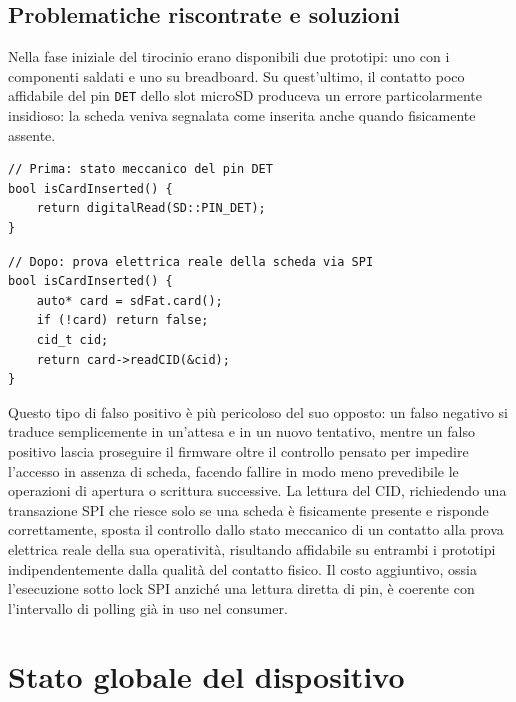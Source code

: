 \subsection{Problematiche riscontrate e soluzioni}

Nella fase iniziale del tirocinio erano disponibili due prototipi: uno con i
componenti saldati e uno su breadboard. Su quest'ultimo, il contatto poco
affidabile del pin \texttt{DET} dello slot microSD produceva un errore
particolarmente insidioso: la scheda veniva segnalata come inserita anche
quando fisicamente assente.

\begin{listing}[H]
\begin{verbatim}
// Prima: stato meccanico del pin DET
bool isCardInserted() {
    return digitalRead(SD::PIN_DET);
}
\end{verbatim}
\caption{Rilevamento della scheda basato sul pin DET}
\label{listing:det-before}
\end{listing}

\begin{listing}[H]
\begin{verbatim}
// Dopo: prova elettrica reale della scheda via SPI
bool isCardInserted() {
    auto* card = sdFat.card();
    if (!card) return false;
    cid_t cid;
    return card->readCID(&cid);
}
\end{verbatim}
\caption{Rilevamento della scheda tramite lettura del CID}
\label{listing:det-after}
\end{listing}

Questo tipo di falso positivo è più pericoloso del suo opposto: un falso
negativo si traduce semplicemente in un'attesa e in un nuovo tentativo, mentre
un falso positivo lascia proseguire il firmware oltre il controllo pensato
per impedire l'accesso in assenza di scheda, facendo fallire in modo meno
prevedibile le operazioni di apertura o scrittura successive. La lettura del
\gls{CID}, richiedendo una transazione \gls{SPI} che riesce solo se una scheda è
fisicamente presente e risponde correttamente, sposta il controllo dallo stato
meccanico di un contatto alla prova elettrica reale della sua operatività,
risultando affidabile su entrambi i prototipi indipendentemente dalla qualità
del contatto fisico. Il costo aggiuntivo, ossia l'esecuzione sotto lock SPI
anziché una lettura diretta di pin, è coerente con l'intervallo di polling già
in uso nel consumer.

\newpage

\section{Stato globale del dispositivo}

